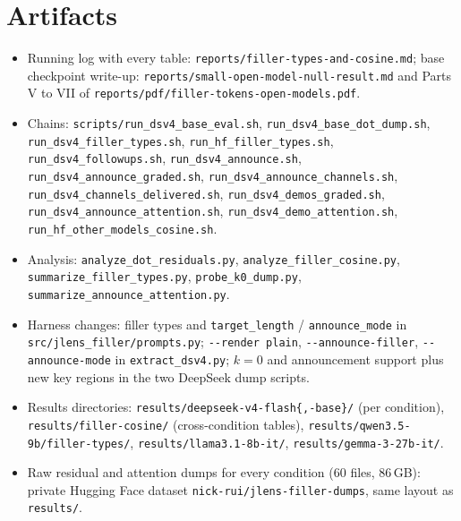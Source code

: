 \documentclass[11pt]{article}
\newcommand{\ttt}[1]{\texttt{\small #1}}
\begin{document}
\appendix
\section{Artifacts}
\begin{raggedright}
\begin{itemize}
\item Running log with every table: \ttt{reports/\allowbreak filler-types-and-cosine.md}; base checkpoint write-up: \ttt{reports/\allowbreak small-open-model-null-result.md} and Parts V to VII of \ttt{reports/\allowbreak pdf/\allowbreak filler-tokens-open-models.pdf}.
\item Chains: \ttt{scripts/\allowbreak run\_dsv4\_base\_eval.sh}, \ttt{run\_dsv4\_base\_dot\_dump.sh}, \ttt{run\_dsv4\_filler\_types.sh}, \ttt{run\_hf\_filler\_types.sh}, \ttt{run\_dsv4\_followups.sh}, \ttt{run\_dsv4\_announce.sh}, \ttt{run\_dsv4\_announce\_graded.sh}, \ttt{run\_dsv4\_announce\_channels.sh}, \ttt{run\_dsv4\_channels\_delivered.sh}, \ttt{run\_dsv4\_demos\_graded.sh}, \ttt{run\_dsv4\_announce\_attention.sh}, \ttt{run\_dsv4\_demo\_attention.sh}, \ttt{run\_hf\_other\_models\_cosine.sh}.
\item Analysis: \ttt{analyze\_dot\_residuals.py}, \ttt{analyze\_filler\_cosine.py}, \ttt{summarize\_filler\_types.py}, \ttt{probe\_k0\_dump.py}, \ttt{summarize\_announce\_attention.py}.
\item Harness changes: filler types and \ttt{target\_length} / \ttt{announce\_mode} in \ttt{src/\allowbreak jlens\_filler/\allowbreak prompts.py}; \ttt{-{}-render plain}, \ttt{-{}-announce-filler}, \ttt{-{}-announce-mode} in \ttt{extract\_dsv4.py}; $k=0$ and announcement support plus new key regions in the two DeepSeek dump scripts.
\item Results directories: \ttt{results/\allowbreak deepseek-v4-flash\{,-base\}/} (per condition), \ttt{results/\allowbreak filler-cosine/} (cross-condition tables), \ttt{results/\allowbreak qwen3.5-9b/\allowbreak filler-types/}, \ttt{results/\allowbreak llama3.1-8b-it/}, \ttt{results/\allowbreak gemma-3-27b-it/}.
\item Raw residual and attention dumps for every condition (60 files, 86\,GB): private Hugging Face dataset \ttt{nick-rui/\allowbreak jlens-filler-dumps}, same layout as \ttt{results/}.
\end{itemize}
\end{raggedright}
\end{document}
